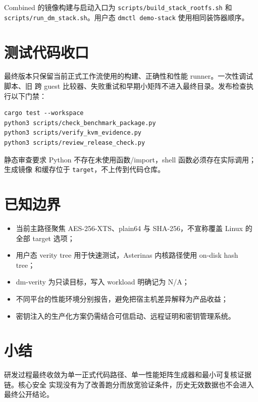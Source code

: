 \begin{sloppypar}
Combined 的镜像构建与启动入口为 \texttt{scripts/\allowbreak build\_\allowbreak stack\_\allowbreak rootfs.sh} 和
\texttt{scripts/\allowbreak run\_\allowbreak dm\_\allowbreak stack.sh}。用户态 \texttt{dmctl demo-stack} 使用相同装饰器顺序。
\end{sloppypar}

\section{测试代码收口}

最终版本只保留当前正式工作流使用的构建、正确性和性能 runner。一次性调试脚本、旧
跨 guest 比较器、失败重试和早期小矩阵不进入最终目录。发布检查执行以下门禁：

\begin{lstlisting}[basicstyle=\ttfamily\small, breaklines=true]
cargo test --workspace
python3 scripts/check_benchmark_package.py
python3 scripts/verify_kvm_evidence.py
python3 scripts/review_release_check.py
\end{lstlisting}

静态审查要求 Python 不存在未使用函数/import，shell 函数必须存在实际调用；生成镜像
和缓存位于 \texttt{target}，不上传到代码仓库。

\section{已知边界}

\begin{itemize}
    \item 当前主路径聚焦 AES-256-XTS、plain64 与 SHA-256，不宣称覆盖 Linux 的全部 target 选项；
    \item 用户态 verity tree 用于快速测试，Asterinas 内核路径使用 on-disk hash tree；
    \item dm-verity 为只读目标，写入 workload 明确记为 N/A；
    \item 不同平台的性能环境分别报告，避免把宿主机差异解释为产品收益；
    \item 密钥注入的生产化方案仍需结合可信启动、远程证明和密钥管理系统。
\end{itemize}

\section{小结}

研发过程最终收敛为单一正式代码路径、单一性能矩阵生成器和最小可复核证据链。核心安全
实现没有为了改善跑分而放宽验证条件，历史无效数据也不会进入最终公开结论。
